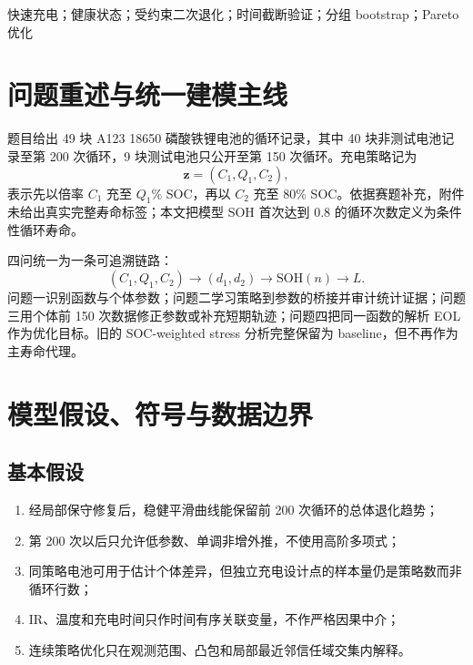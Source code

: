 \documentclass[UTF8,a4paper,zihao=-4]{ctexart}
\newcommand{\SOH}{\mathrm{SOH}}
\begin{document}
\vspace{0.5em}
快速充电；健康状态；受约束二次退化；时间截断验证；分组 bootstrap；Pareto 优化

\newpage

\section{问题重述与统一建模主线}

题目给出 49 块 A123 18650 磷酸铁锂电池的循环记录，其中 40 块非测试电池记录至第 200 次循环，9 块测试电池只公开至第 150 次循环。充电策略记为
\[
  \bm z=(C_1,Q_1,C_2),
\]
表示先以倍率 $C_1$ 充至 $Q_1\%$ SOC，再以 $C_2$ 充至 80\% SOC。依据赛题补充，附件未给出真实完整寿命标签；本文把模型 SOH 首次达到 0.8 的循环次数定义为条件性循环寿命。

四问统一为一条可追溯链路：
\[
  (C_1,Q_1,C_2)\longrightarrow(d_1,d_2)
  \longrightarrow \SOH(n)
  \longrightarrow L.
\]
问题一识别函数与个体参数；问题二学习策略到参数的桥接并审计统计证据；问题三用个体前 150 次数据修正参数或补充短期轨迹；问题四把同一函数的解析 EOL 作为优化目标。旧的 SOC-weighted stress 分析完整保留为 baseline，但不再作为主寿命代理。

\section{模型假设、符号与数据边界}

\subsection{基本假设}

\begin{enumerate}
  \item 经局部保守修复后，稳健平滑曲线能保留前 200 次循环的总体退化趋势；
  \item 第 200 次以后只允许低参数、单调非增外推，不使用高阶多项式；
  \item 同策略电池可用于估计个体差异，但独立充电设计点的样本量仍是策略数而非循环行数；
  \item IR、温度和充电时间只作时间有序关联变量，不作严格因果中介；
  \item 连续策略优化只在观测范围、凸包和局部最近邻信任域交集内解释。
\end{enumerate}
\end{document}
